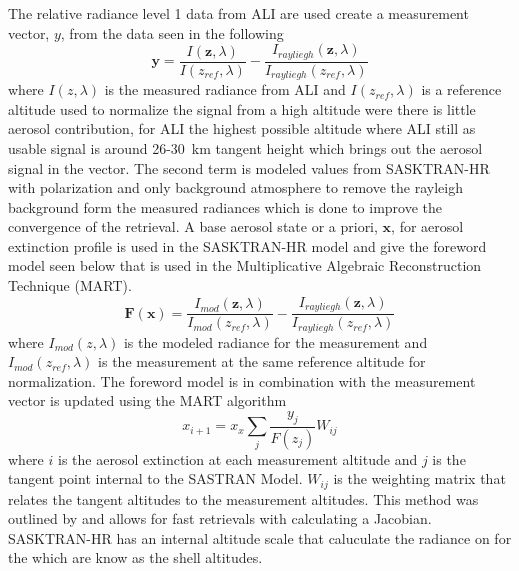 \documentclass[12pt]{article}
\begin{document}
The relative radiance level 1 data from ALI are used create a measurement vector, $y$, from the data seen in the following
\begin{equation}
    \mathbf{y} = \frac{I(\mathbf{z},\lambda)}{I(z_{ref},\lambda)}-\frac{I_{rayliegh}(\mathbf{z},\lambda)}{I_{rayliegh}(z_{ref},\lambda)}
    \label{eqn:measurementVector}
\end{equation}
where $I(z,\lambda)$ is the measured radiance from ALI and $I(z_{ref},\lambda)$ is a reference altitude used to normalize the signal from a high altitude were there is little aerosol contribution, for ALI the highest possible altitude where ALI still as usable signal is around 26-30~km tangent height which brings out the aerosol signal in the vector. The second term is modeled values from SASKTRAN-HR with polarization and only background atmosphere to remove the rayleigh background form the measured radiances which is done to improve the convergence of the retrieval. A base aerosol state or a priori, $\mathbf{x}$, for aerosol extinction profile is used in the SASKTRAN-HR model and give the foreword model seen below that is used in the Multiplicative Algebraic Reconstruction Technique (MART).
\begin{equation}
    \mathbf{F}(\mathbf{x}) = \frac{I_{mod}(
    \mathbf{z},\lambda)}{I_{mod}(z_{ref},\lambda)}-\frac{I_{rayliegh}(\mathbf{z},\lambda)}{I_{rayliegh}(z_{ref},\lambda)}
    \label{eqn:forewordModel}
\end{equation}
where $I_{mod}(z,\lambda)$ is the modeled radiance for the measurement and $I_{mod}(z_{ref},\lambda)$ is the measurement at the same reference altitude for normalization. The foreword model is in combination with the measurement vector is updated using the MART algorithm
\begin{equation}
    x_{i+1} = x_{x}\sum_{j}\frac{y_{j}}{F(z_{j})}W_{ij}
\end{equation}
where $i$ is the aerosol extinction at each measurement altitude and $j$ is the tangent point internal to the SASTRAN Model. $W_{ij}$ is the weighting matrix that relates the tangent altitudes to the measurement altitudes. This method was outlined by \cite{Degenstein2009} and allows for fast retrievals with calculating a Jacobian. SASKTRAN-HR has an internal altitude scale that caluculate the radiance on for the which are know as the shell altitudes.
\end{document}
